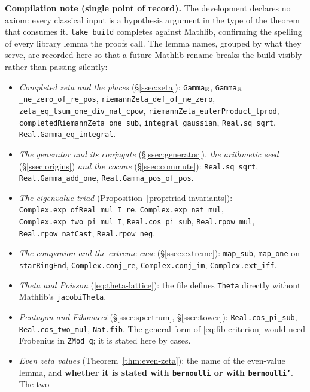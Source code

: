 \smallskip
\sloppy\noindent\textbf{Compilation note (single point of record).} The development declares no
axiom: every classical input is a hypothesis argument in the type of the theorem that consumes it.
\texttt{lake build} completes against Mathlib, confirming the spelling
of every library lemma the proofs call. The lemma names, grouped by what they serve,
are recorded here so that a future Mathlib rename breaks the build visibly rather than
passing silently:
\begin{itemize}\itemsep1pt\parskip0pt
\item \emph{Completed zeta and the places} (\S\ref{ssec:zeta}): \texttt{Gamma}$_{\mathbb{R}}$,
  \texttt{Gamma}$_{\mathbb{R}}$\texttt{\_ne\_zero\_of\_re\_pos}, \texttt{riemannZeta\_def\_of\_ne\_zero},
  \texttt{zeta\_eq\_tsum\_one\_div\_nat\_cpow}, \texttt{riemannZeta\_eulerProduct\_tprod},
  \texttt{completedRiemannZeta\_one\_sub}, \texttt{integral\_gaussian}, \texttt{Real.sq\_sqrt},
  \texttt{Real.Gamma\_eq\_integral}.
\item \emph{The generator and its conjugate} (\S\ref{ssec:generator}), \emph{the arithmetic
  seed} (\S\ref{ssec:origins}) \emph{and the cocone} (\S\ref{ssec:commute}):
  \texttt{Real.sq\_sqrt}, \texttt{Real.Gamma\_add\_one}, \texttt{Real.Gamma\_pos\_of\_pos}.
\item \emph{The eigenvalue triad} (Proposition~\ref{prop:triad-invariants}):
  \texttt{Complex.exp\_ofReal\_mul\_I\_re}, \texttt{Complex.exp\_nat\_mul},
  \texttt{Complex.exp\_two\_pi\_mul\_I}, \texttt{Real.cos\_pi\_sub},
  \texttt{Real.rpow\_mul}, \texttt{Real.rpow\_natCast}, \texttt{Real.rpow\_neg}.
\item \emph{The companion and the extreme case} (\S\ref{ssec:extreme}): \texttt{map\_sub},
  \texttt{map\_one} on \texttt{starRingEnd}, \texttt{Complex.conj\_re},
  \texttt{Complex.conj\_im}, \texttt{Complex.ext\_iff}.
\item \emph{Theta and Poisson} (\eqref{eq:theta-lattice}):
  the file defines \texttt{Theta} directly without Mathlib's \texttt{jacobiTheta}.
\item \emph{Pentagon and Fibonacci} (\S\ref{ssec:spectrum}, \S\ref{ssec:tower}):
  \texttt{Real.cos\_pi\_sub}, \texttt{Real.cos\_two\_mul}, \texttt{Nat.fib}.
  The general form of \eqref{eq:fib-criterion} would need Frobenius in \texttt{ZMod q}; it is
  stated here by cases.
\item \emph{Even zeta values} (Theorem~\ref{thm:even-zeta}): the name of the even-value lemma,
  and \textbf{whether it is stated with \texttt{bernoulli} or with \texttt{bernoulli'}}. The two

\end{itemize}
